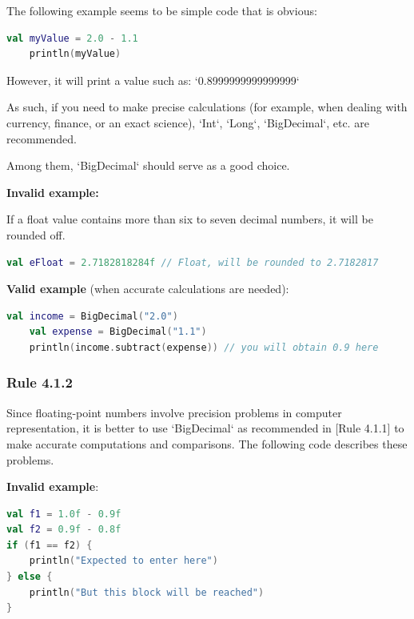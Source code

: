 {{{{The following example seems to be simple code that is obvious:

\begin{lstlisting}[language=Kotlin]
    val myValue = 2.0 - 1.1
    println(myValue)
\end{lstlisting}


However, it will print a value such as: `0.8999999999999999`



As such, if you need to make precise calculations (for example, when dealing with currency, finance, or an exact science), `Int`, `Long`, `BigDecimal`, etc. are recommended.

Among them, `BigDecimal` should serve as a good choice.



\textbf{Invalid example:} \

If a float value contains more than six to seven decimal numbers, it will be rounded off.

\begin{lstlisting}[language=Kotlin]
 val eFloat = 2.7182818284f // Float, will be rounded to 2.7182817
\end{lstlisting}


\textbf{Valid example} (when accurate calculations are needed):

\begin{lstlisting}[language=Kotlin]
    val income = BigDecimal("2.0")
    val expense = BigDecimal("1.1")
    println(income.subtract(expense)) // you will obtain 0.9 here
\end{lstlisting}


\subsubsection*{\textbf{Rule 4.1.2}}
\leavevmode\newline



Since floating-point numbers involve precision problems in computer representation, it is better to use `BigDecimal` as recommended in [Rule 4.1.1] to make accurate computations and comparisons. The following code describes these problems.



\textbf{Invalid example}:

\begin{lstlisting}[language=Kotlin]
val f1 = 1.0f - 0.9f
val f2 = 0.9f - 0.8f
if (f1 == f2) {
    println("Expected to enter here")
} else {
    println("But this block will be reached")
}


\end{lstlisting}}}}}
